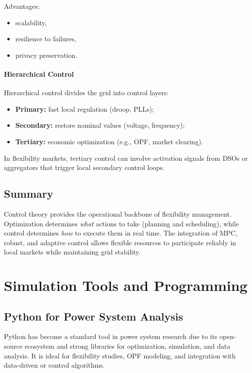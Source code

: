 \documentclass[11pt]{article}
\begin{document}
	Advantages:
	\begin{itemize}
		\item scalability,
		\item resilience to failures,
		\item privacy preservation.
	\end{itemize}
	
	\paragraph{Hierarchical Control}
	
	Hierarchical control divides the grid into control layers:
	\begin{itemize}
		\item \textbf{Primary:} fast local regulation (droop, PLLs);
		\item \textbf{Secondary:} restore nominal values (voltage, frequency);
		\item \textbf{Tertiary:} economic optimization (e.g., OPF, market clearing).
	\end{itemize}
	
	In flexibility markets, tertiary control can involve activation signals from DSOs or aggregators that trigger local secondary control loops.
	
	\subsection*{Summary}
	
	Control theory provides the operational backbone of flexibility management.  
	Optimization determines \emph{what} actions to take (planning and scheduling), while control determines \emph{how} to execute them in real time.  
	The integration of MPC, robust, and adaptive control allows flexible resources to participate reliably in local markets while maintaining grid stability.
	
	
	\section{Simulation Tools and Programming}
	
	\subsection{Python for Power System Analysis}
	
	Python has become a standard tool in power system research due to its open-source ecosystem and strong libraries for optimization, simulation, and data analysis.  
	It is ideal for flexibility studies, OPF modeling, and integration with data-driven or control algorithms.
	
\end{document}
